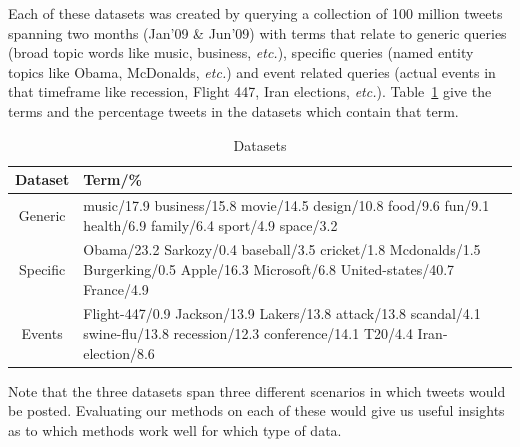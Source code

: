 \documentclass{sig-alternate}
\begin{document}
Each of these datasets was created by querying a collection of 100
million tweets spanning two months (Jan'09 \& Jun'09) with terms
that relate to generic queries (broad topic words like music,
business, {\it etc.}), specific queries (named entity topics like
Obama, McDonalds, {\it etc.}) and event related queries (actual events
in that timeframe like recession, Flight 447, Iran elections, {\it
  etc.}).  Table~\ref{tbl-q} give the terms and the percentage tweets
in the datasets which contain that term.
\begin{table}%
\centering
\caption{Datasets}\label{tbl-q}
\resizebox{8.5cm}{!} 
{
	\begin{tabular}{|c|p{4in}|}
	\hline
        Dataset & Term/\% \\
\hline
Generic &{\small music/17.9 business/15.8 movie/14.5 design/10.8
       food/9.6 fun/9.1 health/6.9 family/6.4 sport/4.9 space/3.2}  \\
Specific &{\small 
Obama/23.2 Sarkozy/0.4 baseball/3.5 cricket/1.8 Mcdonalds/1.5 Burgerking/0.5 Apple/16.3 Microsoft/6.8 United-states/40.7 France/4.9} \\
Events &{\small Flight-447/0.9 Jackson/13.9  Lakers/13.8 attack/13.8 scandal/4.1 swine-flu/13.8 recession/12.3 conference/14.1 T20/4.4 Iran-election/8.6  }\\
	\hline
	\end{tabular}
}\vspace*{-10pt}
\end{table}

Note that the three datasets span three different scenarios in which
tweets would be posted. Evaluating our methods on each of these would
give us useful insights as to which methods work well for which type
of data.
\end{document}
